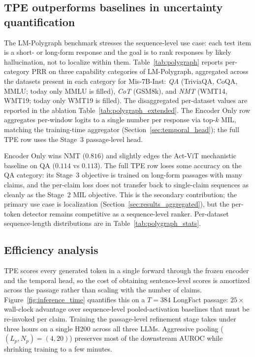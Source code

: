 \subsection{TPE outperforms baselines in uncertainty
quantification}
\label{sec:results_polygraph}



The LM-Polygraph benchmark
\citep{fadeeva2023lmpolygraph,vashurin2025lmpolygraph} stresses
the sequence-level use case: each test item is a short- or long-form
response and the goal is to rank responses by likely hallucination,
not to localize within them. Table~\ref{tab:polygraph} reports
per-category PRR on three capability categories of LM-Polygraph,
aggregated across the datasets present in each category for
Mis-7B-Inst: \emph{QA} (TriviaQA, CoQA, MMLU; today only MMLU
is filled), \emph{CoT} (GSM8k), and \emph{NMT} (WMT14, WMT19;
today only WMT19 is filled). The disaggregated per-dataset values
are reported in the ablation
Table~\ref{tab:polygraph_extended}. The Encoder Only row
aggregates per-window logits to a single number per response via
top-$k$ MIL, matching the training-time aggregator
(Section~\ref{sec:temporal_head}); the full TPE row uses the
Stage~3 passage-level head.

Encoder Only wins NMT ($0.816$) and slightly edges the Act-ViT
mechanistic baseline on QA ($0.114$ vs $0.113$). The full TPE
row loses some accuracy on the QA category: its Stage~3
objective is trained on long-form passages with many claims, and
the per-claim loss does not transfer back to single-claim
sequences as cleanly as the Stage~2 MIL objective. This is the
secondary contribution; the primary use case is localization
(Section~\ref{sec:results_aggregated}),
but the per-token detector remains competitive as a sequence-level
ranker. Per-dataset sequence-length distributions are in
Table~\ref{tab:polygraph_stats}.

\subsection{Efficiency analysis}
\label{sec:results_efficiency}

TPE scores every generated token in a single forward through
the frozen encoder and the temporal head, so the cost of obtaining
sentence-level scores is amortized across the passage
rather than scaling with the number of claims.
Figure~\ref{fig:inference_time} quantifies this on a $T = 384$
LongFact passage: $25\times$ wall-clock advantage over
sequence-level pooled-activation baselines that must be re-invoked
per claim. Training the passage-level
refinement stage takes under three hours on a single H200 across
all three LLMs. Aggressive pooling
($(L_p, N_p) = (4, 20)$) preserves most of the downstream AUROC
while shrinking training to a few minutes.


